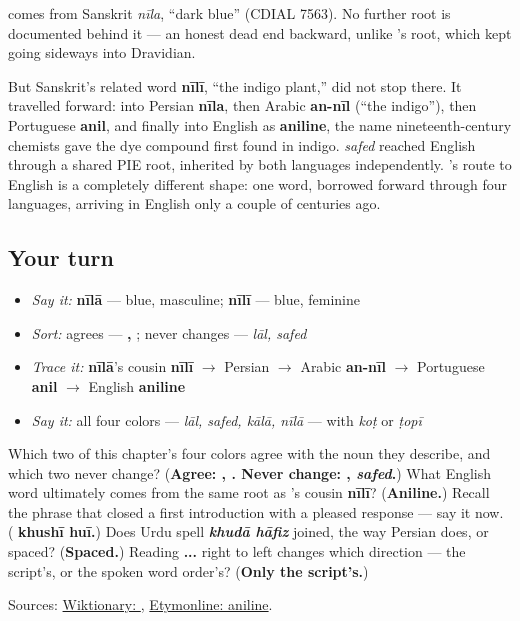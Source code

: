 \begin{cousinweb}
\textbf{} comes from Sanskrit \emph{nīla}, \textquotedblleft{}dark blue\textquotedblright{} (CDIAL 7563). No further root is documented behind it — an honest dead end backward, unlike \textbf{}'s root, which kept going sideways into Dravidian.

But Sanskrit's related word \textbf{nīlī}, \textquotedblleft{}the indigo plant,\textquotedblright{} did not stop there. It travelled forward: into Persian \textbf{nīla}, then Arabic \textbf{an-nīl} (\textquotedblleft{}the indigo\textquotedblright{}), then Portuguese \textbf{anil}, and finally into English as \textbf{aniline}, the name nineteenth-century chemists gave the dye compound first found in indigo. \emph{safed} reached English through a shared PIE root, inherited by both languages independently. \textbf{}'s route to English is a completely different shape: one word, borrowed forward through four languages, arriving in English only a couple of centuries ago.
\end{cousinweb}

\subsection*{Your turn}
\begin{itemize}
\raggedright
  \item \emph{Say it:} \textbf{nīlā} — blue, masculine; \textbf{nīlī} — blue, feminine
  \item \emph{Sort:} agrees — \textbf{, }; never changes — \emph{lāl, safed}
  \item \emph{Trace it:} \textbf{nīlā}'s cousin \textbf{nīlī} $\to$ Persian $\to$ Arabic \textbf{an-nīl} $\to$ Portuguese \textbf{anil} $\to$ English \textbf{aniline}
  \item \emph{Say it:} all four colors — \emph{lāl, safed, kālā, nīlā} — with \emph{koṭ} or \emph{ṭopī}
\end{itemize}

\begin{tcolorbox}[breakable,colback=teal!4,colframe=teal!35!black,title={Before you move on}]
Which two of this chapter's four colors agree with the noun they describe, and which two never change? (\textbf{Agree: , . Never change: , \emph{safed}.}) What English word ultimately comes from the same root as \textbf{}'s cousin \textbf{nīlī}? (\textbf{Aniline.}) Recall the phrase that closed a first introduction with a pleased response — say it now. (\textbf{    khushī huī.}) Does Urdu spell \emph{\textbf{khudā hāfiz}} joined, the way Persian does, or spaced? (\textbf{Spaced.}) Reading \textbf{  ... } right to left changes which direction — the script's, or the spoken word order's? (\textbf{Only the script's.})

Sources: \href{https://en.wiktionary.org/wiki/\%D9\%86\%DB\%8C\%D9\%84\%D8\%A7}{Wiktionary: }, \href{https://www.etymonline.com/word/aniline}{Etymonline: aniline}.
\end{tcolorbox}
